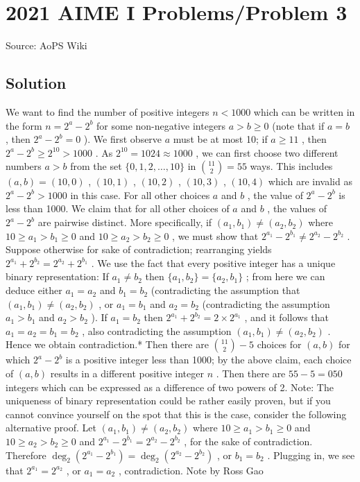 \documentclass[12pt]{article}
\begin{document}
\section*{{2021 AIME I Problems/Problem 3}}
Source: AoPS Wiki

\subsection*{Solution}
We want to find the number of positive integers $n<1000$ which can be written in the form $n = 2^a - 2^b$ for some non-negative integers $a > b \ge 0$ (note that if $a=b$ , then $2^a-2^b = 0$ ). We first observe $a$ must be at most 10; if $a \ge 11$ , then $2^a - 2^b \ge 2^{10} > 1000$ . As $2^{10} = 1024 \approx 1000$ , we can first choose two different numbers $a > b$ from the set $\{0,1,2,\ldots,10\}$ in $\binom{11}{2}=55$ ways. This includes $(a,b) = (10,0)$ , $(10,1)$ , $(10,2)$ , $(10,3)$ , $(10,4)$ which are invalid as $2^a - 2^b > 1000$ in this case. For all other choices $a$ and $b$ , the value of $2^a - 2^b$ is less than 1000. We claim that for all other choices of $a$ and $b$ , the values of $2^a - 2^b$ are pairwise distinct. More specifically, if $(a_1,b_1) \neq (a_2,b_2)$ where $10 \ge a_1 > b_1 \ge 0$ and $10 \ge a_2 > b_2 \ge 0$ , we must show that $2^{a_1}-2^{b_1} \neq 2^{a_2} - 2^{b_2}$ . Suppose otherwise for sake of contradiction; rearranging yields $2^{a_1}+2^{b_2} = 2^{a_2}+2^{b_1}$ . We use the fact that every positive integer has a unique binary representation: If $a_1 \neq b_2$ then $\{a_1,b_2\} = \{a_2,b_1\}$ ; from here we can deduce either $a_1=a_2$ and $b_1=b_2$ (contradicting the assumption that $(a_1,b_1) \neq (a_2,b_2)$ , or $a_1=b_1$ and $a_2=b_2$ (contradicting the assumption $a_1>b_1$ and $a_2>b_2$ ). If $a_1 = b_2$ then $2^{a_1}+2^{b_2} = 2 \times 2^{a_1}$ , and it follows that $a_1=a_2=b_1=b_2$ , also contradicting the assumption $(a_1,b_1) \neq (a_2,b_2)$ . Hence we obtain contradiction.* Then there are $\binom{11}{2}-5$ choices for $(a,b)$ for which $2^a - 2^b$ is a positive integer less than 1000; by the above claim, each choice of $(a,b)$ results in a different positive integer $n$ . Then there are $55-5 = \boxed{050}$ integers which can be expressed as a difference of two powers of 2. Note: The uniqueness of binary representation could be rather easily proven, but if you cannot convince yourself on the spot that this is the case, consider the following alternative proof. Let $(a_1,b_1) \neq (a_2,b_2)$ where $10 \ge a_1 > b_1 \ge 0$ and $10 \ge a_2 > b_2 \ge 0$ and $2^{a_1}-2^{b_1} = 2^{a_2} - 2^{b_2}$ , for the sake of contradiction. Therefore $\deg_{2}(2^{a_1}-2^{b_1})=\deg_{2}(2^{a_2}-2^{b_2})$ , or $b_1=b_2$ . Plugging in, we see that $2^{a_1}=2^{a_2}$ , or $a_1=a_2$ , contradiction. Note by Ross Gao
\end{document}
